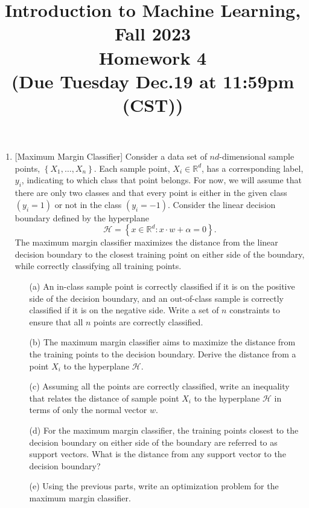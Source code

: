 \documentclass[10pt]{article}
\begin{document}
 \date{}
\title{Introduction to Machine Learning, Fall 2023 \\
	Homework 4\\
	\small (Due Tuesday Dec.19 at 11:59pm (CST))}
\maketitle

\begin{enumerate}[1.]
	   \item {} [Maximum Margin Classifier]
           Consider a data set of $n d$-dimensional sample points, $\left\{X_1, \ldots, X_n\right\}$. Each sample point, $X_i \in \mathbb{R}^d$, has a corresponding label, $y_i$, indicating to which class that point belongs. For now, we will assume that there are only two classes and that every point is either in the given class $\left(y_i=1\right)$ or not in the class $\left(y_i=-1\right)$. Consider the linear decision boundary defined by the hyperplane
            $$
            \mathcal{H}=\left\{x \in \mathbb{R}^d: x \cdot w+\alpha=0\right\} .
            $$
            The maximum margin classifier maximizes the distance from the linear decision boundary to the closest training point on either side of the boundary, while correctly classifying all training points.
	      \begin{itemize}

        \item[(a)] An in-class sample point is correctly classified if it is on the positive side of the decision boundary, and an out-of-class sample is correctly classified if it is on the negative side. Write a set of $n$ constraints to ensure that all $n$ points are correctly classified.~
            \item[(b)]The maximum margin classifier aims to maximize the distance from the training points to the decision boundary. Derive the distance from a point $X_i$ to the hyperplane $\mathcal{H}$.~
            \item[(c)] Assuming all the points are correctly classified, write an inequality that relates the distance of sample point $X_i$ to the hyperplane $\mathcal{H}$ in terms of only the normal vector $w$.~
            \item[(d)] For the maximum margin classifier, the training points closest to the decision boundary on either side of the boundary are referred to as support vectors. What is the distance from any support vector to the decision boundary?~
            \item[(e)] Using the previous parts, write an optimization problem for the maximum margin classifier.~
	      \end{itemize}


\end{enumerate}
\end{document}

